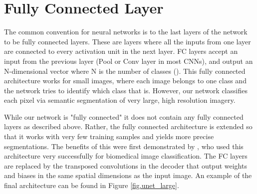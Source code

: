 \section{Fully Connected Layer}
The common convention for neural networks is to the last layers of the network to be fully connected layers. These are layers where all the inputs from one layer are connected to every activation unit in the next layer. FC layers accept an input from the previous layer (Pool or Conv layer in most CNNs), and output an N-dimensional vector where N is the number of classes (\cite{simard03}). This fully connected architecture works for small images, where each image belongs to one class and the network tries to identify which class that is. However, our network classifies each pixel via semantic segmentation of very large, high resolution imagery.
\par
While our network is "fully connected" it does not contain any fully connected layers as described above. Rather, the fully connected architecture is extended so that it works with very few training samples and yields more precise segmentations. The benefits of this were first demonstrated by \citet{ronneberger15}, who used this architecture very successfully for biomedical image classification.  The FC layers are replaced by the transposed convolutions in the decoder that output weights and biases in the same spatial dimensions as the input image. An example of the final architecture can be found in \citet{Richmond19a} Figure \ref{fig.unet_large}.

